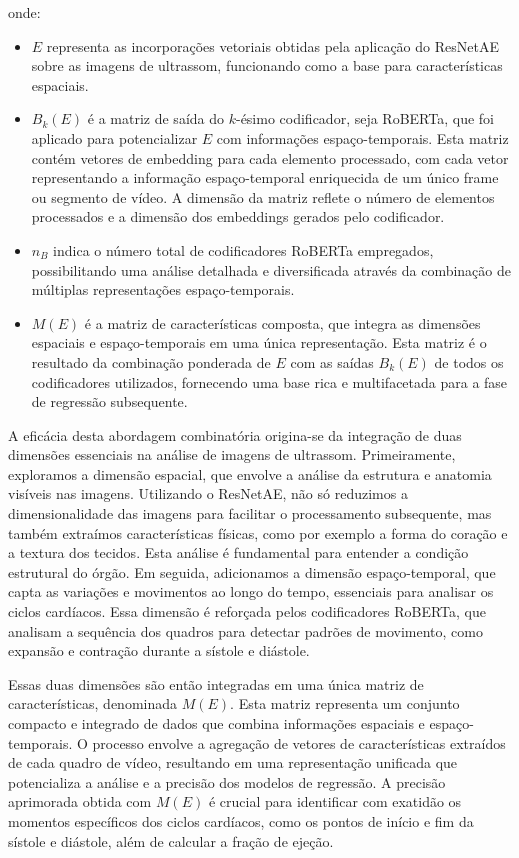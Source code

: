 onde:
\begin{itemize}
    \item $E$ representa as incorporações vetoriais obtidas pela aplicação do ResNetAE sobre as imagens de ultrassom, funcionando como a base para características espaciais.
    \item $B_k(E)$ é a matriz de saída do $k$-ésimo codificador, seja RoBERTa, que foi aplicado para potencializar $E$ com informações espaço-temporais. Esta matriz contém vetores de embedding para cada elemento processado, com cada vetor representando a informação espaço-temporal enriquecida de um único frame ou segmento de vídeo. A dimensão da matriz reflete o número de elementos processados e a dimensão dos embeddings gerados pelo codificador.
    \item $n_B$ indica o número total de codificadores RoBERTa empregados, possibilitando uma análise detalhada e diversificada através da combinação de múltiplas representações espaço-temporais.
    \item $M(E)$ é a matriz de características composta, que integra as dimensões espaciais e espaço-temporais em uma única representação. Esta matriz é o resultado da combinação ponderada de $E$ com as saídas $B_k(E)$ de todos os codificadores utilizados, fornecendo uma base rica e multifacetada para a fase de regressão subsequente.
\end{itemize}


A eficácia desta abordagem combinatória origina-se da integração de duas dimensões essenciais na análise de imagens de ultrassom. Primeiramente, exploramos a dimensão espacial, que envolve a análise da estrutura e anatomia visíveis nas imagens. Utilizando o ResNetAE, não só reduzimos a dimensionalidade das imagens para facilitar o processamento subsequente, mas também extraímos características físicas, como por exemplo a forma do coração e a textura dos tecidos. Esta análise é fundamental para entender a condição estrutural do órgão. Em seguida, adicionamos a dimensão espaço-temporal, que capta as variações e movimentos ao longo do tempo, essenciais para analisar os ciclos cardíacos. Essa dimensão é reforçada pelos codificadores RoBERTa, que analisam a sequência dos quadros para detectar padrões de movimento, como expansão e contração durante a sístole e diástole.

Essas duas dimensões são então integradas em uma única matriz de características, denominada \(M(E)\). Esta matriz representa um conjunto compacto e integrado de dados que combina informações espaciais e espaço-temporais. O processo envolve a agregação de vetores de características extraídos de cada quadro de vídeo, resultando em uma representação unificada que potencializa a análise e a precisão dos modelos de regressão. A precisão aprimorada obtida com \(M(E)\) é crucial para identificar com exatidão os momentos específicos dos ciclos cardíacos, como os pontos de início e fim da sístole e diástole, além de calcular a fração de ejeção.


